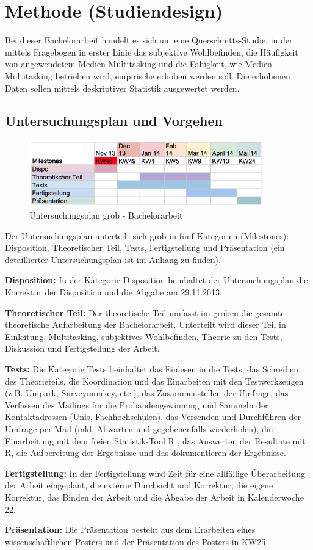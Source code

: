\section*{Methode (Studiendesign)}\label{section.methode}
Bei dieser Bachelorarbeit handelt es sich um eine Querschnitts-Studie, in der mittels Fragebogen in erster Linie das subjektive Wohlbefinden, die Häufigkeit von angewendetem Medien-Multitasking und die Fähigkeit, wie Medien-Multitasking betrieben wird, empirische erhoben werden soll. Die erhobenen Daten sollen mittels deskriptiver Statistik ausgewertet werden.
\subsection*{Untersuchungsplan und Vorgehen}

\begin{figure}[H]
	\centering
	    \includegraphics[width=0.9\textwidth]
		{images/Untersuchungsplan_Grob.png}
	\caption{Untersuchungsplan grob - Bachelorarbeit}
	\label{fig.UntersuchungsplanGrob}
\end{figure}
Der Untersuchungsplan unterteilt sich grob in fünf Kategorien (Milestones): Disposition, Theoretischer Teil, Tests, Fertigstellung und Präsentation (ein detaillierter Untersuchungsplan ist im Anhang zu finden).\par
\textbf{Disposition:} In der Kategorie Disposition beinhaltet der Untersuchungsplan die Korrektur der Disposition und die Abgabe am 29.11.2013.\par
\textbf{Theoretischer Teil:} Der theoretische Teil umfasst im groben die gesamte theoretische Aufarbeitung der Bachelorarbeit. Unterteilt wird dieser Teil in Einleitung, Multitasking, subjektives Wohlbefinden, Theorie zu den Tests, Diskussion und Fertigstellung der Arbeit. \par
\textbf{Tests:} Die Kategorie Tests beinhaltet das Einlesen in die Tests, das Schreiben des Theorieteils, die Koordination und das Einarbeiten mit den Testwerkzeugen (z.B. Unipark, Surveymonkey, etc.), das Zusammenstellen der Umfrage, das Verfassen des Mailings für die Probandengewinnung und Sammeln der Kontaktadressen (Unis, Fachhochschulen), das Versenden und Durchführen der Umfrage per Mail (inkl. Abwarten und gegebenenfalls wiederholen), die Einarbeitung mit dem freien Statistik-Tool R \cite{Luhmann2013}, das Auswerten der Resultate mit R, die Aufbereitung der Ergebnisse und das dokumentieren der Ergebnisse.\par
\textbf{Fertigstellung:} In der Fertigstellung wird Zeit für eine allfällige Überarbeitung der Arbeit eingeplant, die externe Durchsicht und Korrektur, die eigene Korrektur, das Binden der Arbeit und die Abgabe der Arbeit in Kalenderwoche 22.\par
\textbf{Präsentation:} Die Präsentation besteht aus dem Erarbeiten eines wissenschaftlichen Posters und der Präsentation des Posters in KW25.\par
